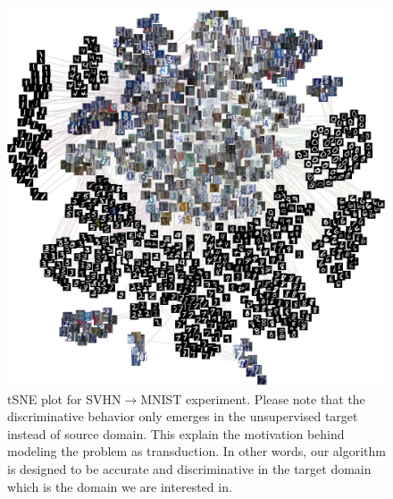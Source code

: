 \begin{figure}[ht]
    \label{fig:tsne}
        \includegraphics[width=\textwidth]{out_im.png}
        \vspace{-5mm}
\caption{tSNE plot for SVHN$\rightarrow$MNIST experiment. Please note that the discriminative behavior only emerges in the unsupervised target instead of source domain. This explain the motivation behind modeling the problem as transduction. In other words, our algorithm is designed to be accurate and discriminative in the target domain which is the domain we are interested in.  }
\label{fig:tsnedigit}
\end{figure}
